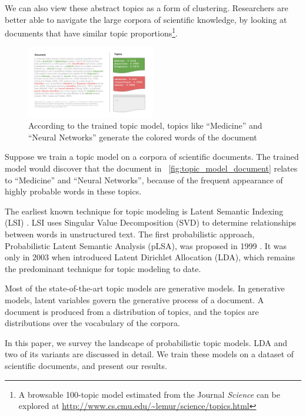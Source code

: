 \documentclass[letterpaper]{article}
\begin{document}
We can also view these abstract topics as a form of clustering.
Researchers are better able to navigate the large corpora of
scientific knowledge, by looking at documents that have similar topic
proportions\footnote{A browsable 100-topic model estimated from the
  Journal \textit{Science} can be explored at
  \url{http://www.cs.cmu.edu/~lemur/science/topics.html}}.

\begin{figure}[ht]
  \centering
  \includegraphics[width=0.5\textwidth]{topic_models.png}
  \caption{\label{fig:topic_model_document} According to the trained
    topic model, topics like ``Medicine'' and ``Neural Networks''
    generate the colored words of the document}
\end{figure}

Suppose we train a topic model on a corpora of scientific documents.
The trained model would discover that the document in
~\autoref{fig:topic_model_document} relates to ``Medicine'' and
``Neural Networks'', because of the frequent appearance of highly
probable words in these topics.

The earliest known technique for topic modeling is Latent Semantic
Indexing (LSI) \cite{deerwester1990indexing}. LSI uses Singular Value
Decomposition (SVD) to determine relationships between words in
unstructured text. The first probabilistic approach, Probabilistic
Latent Semantic Analysis (pLSA), was proposed in 1999
\cite{hofmann1999probabilistic}. It was only in 2003 when
\citeauthor{blei2003latent} introduced Latent Dirichlet Allocation
(LDA), which remains the predominant technique for topic
modeling to date.

Most of the state-of-the-art topic models are generative models. In
generative models, latent variables govern the generative process of a
document. A document is produced from a distribution of topics, and
the topics are distributions over the vocabulary of the corpora.

In this paper, we survey the landscape of probabilistic topic models.
LDA and two of its variants are discussed in detail. We train these
models on a dataset of scientific documents, and present our results.
\end{document}
